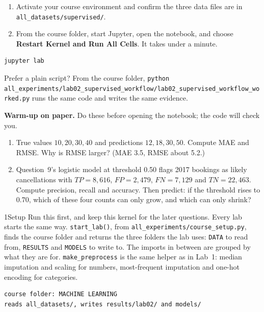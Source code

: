 \begin{labmode}
\begin{enumerate}
  \item Activate your course environment and confirm the three data files are in \texttt{all\_datasets/\allowbreak supervised/}.
  \item From the course folder, start Jupyter, open the notebook, and choose \textbf{Restart Kernel and Run All Cells}. It takes under a minute.
\end{enumerate}
\begin{lstlisting}[style=utpterminal]
jupyter lab
\end{lstlisting}
Prefer a plain script? From the course folder, \texttt{python all\_experiments/\allowbreak lab02\_supervised\_workflow/\allowbreak lab02\_supervised\_workflow\_worked.py} runs the same code and writes the same evidence.
\end{labmode}

\labroutine

\begin{yourturn}
\textbf{Warm-up on paper.} Do these before opening the notebook; the code will check you.
\begin{enumerate}
  \item True values $10,20,30,40$ and predictions $12,18,30,50$. Compute MAE and RMSE. Why is RMSE larger? (MAE 3.5, RMSE about 5.2.)
  \item Question~9's logistic model at threshold 0.50 flags 2017 bookings as likely cancellations with $TP=8{,}616$, $FP=2{,}479$, $FN=7{,}129$ and $TN=22{,}463$. Compute precision, recall and accuracy. Then predict: if the threshold rises to 0.70, which of these four counts can only grow, and which can only shrink?
\end{enumerate}
\end{yourturn}

\begin{labquestion}{1}{Setup}
Run this first, and keep this kernel for the later questions. Every lab starts the same way. \texttt{start\_lab()}, from \texttt{all\_experiments/\allowbreak course\_setup.py}, finds the course folder and returns the three folders the lab uses: \texttt{DATA} to read from, \texttt{RESULTS} and \texttt{MODELS} to write to. The imports in between are grouped by what they are for. \texttt{make\_preprocess} is the same helper as in Lab~1: median imputation and scaling for numbers, most-frequent imputation and one-hot encoding for categories.
\end{labquestion}
\begin{labanswer}

\begin{refoutput}
\begin{lstlisting}[style=utpterminal]
course folder: MACHINE LEARNING
reads all_datasets/, writes results/lab02/ and models/
\end{lstlisting}
\end{refoutput}
\end{labanswer}

